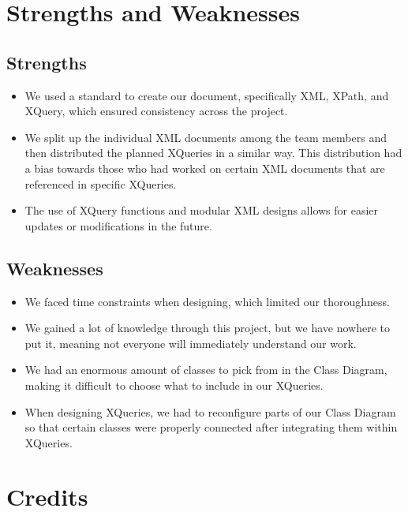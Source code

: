 \documentclass{article} %
\begin{document}
\section{Strengths and Weaknesses}
\subsection{Strengths}

\begin{itemize}
    \item We used a standard to create our document, specifically XML, XPath, and XQuery, which ensured consistency across the project.
    \item We split up the individual XML documents among the team members and then distributed the planned XQueries in a similar way. This distribution had a bias towards those who had worked on certain XML documents that are referenced in specific XQueries.
    \item The use of XQuery functions and modular XML designs allows for easier updates or modifications in the future.
\end{itemize}

\subsection{Weaknesses}

\begin{itemize}
    \item We faced time constraints when designing, which limited our thoroughness.
    \item We gained a lot of knowledge through this project, but we have nowhere to put it, meaning not everyone will immediately understand our work.
    \item We had an enormous amount of classes to pick from in the Class Diagram, making it difficult to choose what to include in our XQueries.
    \item When designing XQueries, we had to reconfigure parts of our Class Diagram so that certain classes were properly connected after integrating them within XQueries.
\end{itemize}
\section{Credits}
\end{document}
